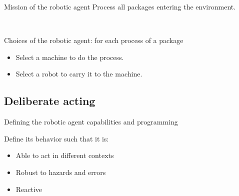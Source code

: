 \begin{frame}{Mission of the robotic agent}
Process all packages entering the environment.

~~

\pause
Choices of the robotic agent: for each process of a package
\begin{itemize}
    \pause
    \item Select a machine to do the process.
    \pause
    \item Select a robot to carry it to the machine.
\end{itemize}

\end{frame}


\subsection{Deliberate acting}

\begin{frame}{Defining the robotic agent capabilities and programming}

    Define its behavior such that it is:
    \begin{itemize}
        \pause
        \item Able to act in different contexts
        \pause
        \item Robust to hazards and errors
        \pause
        \item Reactive
    \end{itemize}
   
\end{frame}

